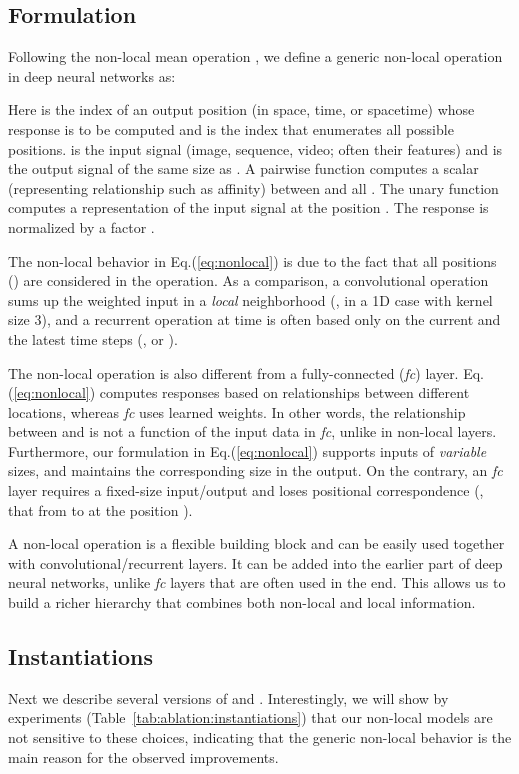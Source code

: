 \documentclass[10pt,twocolumn,letterpaper]{article}
\begin{document}
\subsection{Formulation}
Following the non-local mean operation \cite{Buades2005}, we define a generic non-local operation in deep neural networks as:

Here  is the index of an output position (in space, time, or spacetime) whose response is to be computed and  is the index that enumerates all possible positions.  is the input signal (image, sequence, video; often their features) and  is the output signal of the same size as . A pairwise function  computes a scalar (representing relationship such as affinity) between  and all . The unary function  computes a representation of the input signal at the position . The response is normalized by a factor .

The non-local behavior in Eq.(\ref{eq:nonlocal}) is due to the fact that all positions () are considered in the operation. As a comparison, a convolutional operation sums up the  weighted input in a \emph{local} neighborhood (\eg,  in a 1D case with kernel size 3), and a recurrent operation at time  is often based only on the current and the latest time steps (\eg,  or ).

The non-local operation is also different from a fully-connected (\emph{fc}) layer. Eq.(\ref{eq:nonlocal}) computes responses based on relationships between different locations, whereas \emph{fc} uses learned weights. In other words, the relationship between  and  is not a function of the input data in \emph{fc}, unlike in non-local layers. Furthermore, our formulation in Eq.(\ref{eq:nonlocal}) supports inputs of \emph{variable} sizes, and maintains the corresponding size in the output.
On the contrary, an \emph{fc} layer requires a fixed-size input/output and loses positional correspondence (\eg, that from  to  at the position ).

A non-local operation is a flexible building block and can be easily used together with convolutional/recurrent layers. It can be added into the earlier part of deep neural networks, unlike \emph{fc} layers that are often used in the end.
This allows us to build a richer hierarchy that combines both non-local and local information.

\subsection{Instantiations}\label{sec:instantiations}
\vspace{-.2em}
Next we describe several versions of  and . Interestingly, we will show by experiments (Table~\ref{tab:ablation:instantiations}) that our non-local models are not sensitive to these choices, indicating that the generic non-local behavior is the main reason for the observed improvements.
\end{document}
